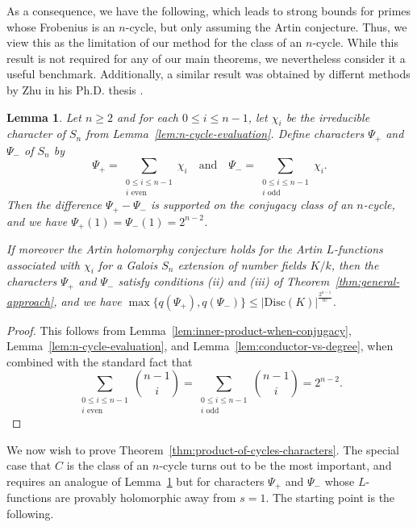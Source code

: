 \documentclass[12pt]{amsart}
\newtheorem{lemma}[theorem]{Lemma}
\theoremstyle{definition} \newtheorem{definition}[theorem]{Definition}
\theoremstyle{example} \newtheorem{example}[theorem]{Example}
\theoremstyle{remark} \newtheorem{remark}{Remark}[theorem]
\numberwithin{equation}{section}
\numberwithin{theorem}{section}
\renewcommand{\leq}{\leqslant}
\renewcommand{\geq}{\geqslant}
\begin{document}
	As a consequence, we have the following, which leads to strong bounds for primes whose Frobenius is an $n$-cycle, but only assuming the Artin conjecture.  Thus, we view this as the limitation of our method for the class of an $n$-cycle.  While this result is not required for any of our main theorems, we nevertheless consider it a useful benchmark.  Additionally, a similar result was obtained by differnt methods by Zhu in his Ph.D. thesis \cite[Corollary~1.8]{Zhu-Thesis}.
	
	\begin{lemma} \label{lem:n-cycle-artin}
		Let $n \geq 2$ and for each $0 \leq i \leq n-1$, let $\chi_i$ be the irreducible character of $S_n$ from Lemma~\ref{lem:n-cycle-evaluation}.  Define characters $\Psi_+$ and $\Psi_-$ of $S_n$ by
			\[
				\Psi_+ = \sum_{\substack{ 0 \leq i \leq n-1 \\ i \text{ even}}} \chi_i
					\quad \text{and} \quad
				\Psi_- = \sum_{\substack{ 0 \leq i \leq n-1 \\ i \text{ odd}}} \chi_i.
			\]
		Then the difference $\Psi_+ - \Psi_-$ is supported on the conjugacy class of an $n$-cycle, and we have $\Psi_+(1) = \Psi_-(1) = 2^{n-2}$.  
		
		If moreover the Artin holomorphy conjecture holds for the Artin $L$-functions associated with $\chi_i$ for a Galois $S_n$ extension of number fields $K/k$, then the characters $\Psi_+$ and $\Psi_-$ satisfy conditions (ii) and (iii) of Theorem~\ref{thm:general-approach}, and we have $\max\{ q(\Psi_+), q(\Psi_-) \} \leq |\mathrm{Disc}(K)|^{\frac{2^{n-1}}{n!}}$.
	\end{lemma}
	\begin{proof}
		This follows from Lemma~\ref{lem:inner-product-when-conjugacy}, Lemma~\ref{lem:n-cycle-evaluation}, and Lemma~\ref{lem:conductor-vs-degree}, when combined with the standard fact that
			\[
				\sum_{\substack{ 0 \leq i \leq n-1 \\ i \text{ even}}} \binom{n-1}{i} = 
				\sum_{\substack{ 0 \leq i \leq n-1 \\ i \text{ odd}}} \binom{n-1}{i} =
				2^{n-2}.
			\]
	\end{proof}
	
	We now wish to prove Theorem~\ref{thm:product-of-cycles-characters}. The special case that $C$ is the class of an $n$-cycle turns out to be the most important, and requires an analogue of Lemma~\ref{lem:n-cycle-artin} but for characters $\Psi_+$ and $\Psi_-$ whose $L$-functions are provably holomorphic away from $s=1$.  The starting point is the following.
	
\end{document}
